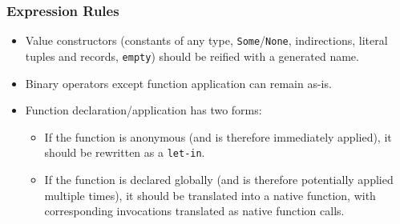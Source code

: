 \documentclass{article}
\begin{document}
    \subsubsection{Expression Rules}

    \begin{itemize}
        \item Value constructors (constants of any type, \texttt{Some}/\texttt{None}, indirections,
            literal tuples and records, \texttt{empty}) should be reified with a generated name.
        \item Binary operators except function application can remain as-is.
        \item Function declaration/application has two forms:
            \begin{itemize}
                \item If the function is anonymous (and is therefore immediately applied), it should
                    be rewritten as a \texttt{let-in}.
                \item If the function is declared globally (and is therefore potentially applied
                    multiple times), it should be translated into a native function, with
                    corresponding invocations translated as native function calls.
            \end{itemize}
    \end{itemize}
%
\end{document}
